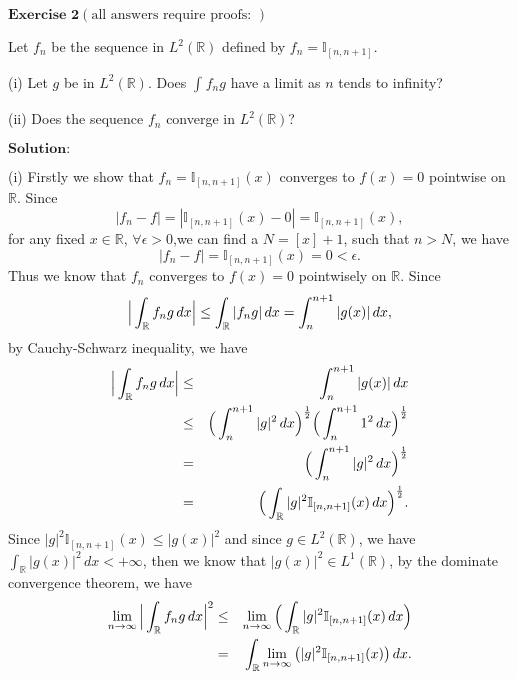 \documentclass[12pt,a4paper]{ctexart}
\begin{document}
\newpage


$\textbf{Exercise 2}  (\text{all answers require proofs: })$

Let $f_{n}$ be the sequence in $L^{2}(\mathbb{R})$ defined by $f_{n} = \mathbb{I}_{[n, n+1]}$.

(i) Let $g$ be in $L^{2}(\mathbb{R})$. Does $\int_{}^{} f_{n} g$ have a limit as $n$ tends to infinity?

(ii) Does the sequence $f_{n}$ converge in $L^{2}(\mathbb{R})$?

\vspace{8pt}
$\textbf{Solution:}$

(i) Firstly we show that $f_{n} = \mathbb{I}_{[n, n+1]} (x)$ converges to $f(x) = 0$ pointwise on $\mathbb{R}$. Since 
\begin{equation*}
    |f_{n} - f| = |\mathbb{I}_{[n, n+1]} (x) - 0| = \mathbb{I}_{[n, n+1]} (x), 
\end{equation*}
for any fixed $x \in \mathbb{R}$, $\forall \epsilon > 0$,we can find a $N = [x] + 1$, such that $n > N$, we have 
\begin{equation*}
    |f_{n} - f| = \mathbb{I}_{[n, n+1]} (x) = 0 < \epsilon.
\end{equation*}
Thus we know that $f_{n}$ converges to $f(x) = 0$ pointwisely on $\mathbb{R}$. Since  
\begin{equation*}
    \Big{|} \int_{\mathbb{R}}^{} f_{n} g \, d x \Big{|} \leq \int_{\mathbb{R}}^{} | f_{n} g | \, d x = \int_{n}^{n + 1} | g (x) | \, d x,
\end{equation*}
by Cauchy-Schwarz inequality, we have
\begin{eqnarray*}
\Big{|} \int_{\mathbb{R}}^{} f_{n} g \, d x \Big{|} & \leq & \int_{n}^{n + 1} | g (x) | \, d x \\
& \leq & \Big{(} \int_{n}^{n+1} |g|^{2} \, d x \Big{)}^{\frac{1}{2}} \Big{(} \int_{n}^{n+1} 1^{2} \, d x \Big{)}^{\frac{1}{2}} \\
& = & \Big{(} \int_{n}^{n+1} |g|^{2} \, d x \Big{)}^{\frac{1}{2}} \\ 
& = & \Big{(} \int_{\mathbb{R}}^{} |g|^{2} \mathbb{I}_{[n, n+1]} (x) \, d x \Big{)}^{\frac{1}{2}}.
\end{eqnarray*}
Since $|g|^{2} \mathbb{I}_{[n, n+1]} (x) \leq |g(x)|^{2}$ and since $g \in L^{2}(\mathbb{R})$, we have $\int_{\mathbb{R}}^{} |g(x)|^{2} \, d x < + \infty$, then we know that $|g(x)|^{2} \in L^{1}(\mathbb{R})$, by the dominate convergence theorem, we have
\begin{eqnarray*}
\lim_{n \to \infty} \Big{|} \int_{\mathbb{R}}^{} f_{n} g \, d x \Big{|}^{2} & \leq & \lim_{n \to \infty} \Big{(} \int_{\mathbb{R}}^{} |g|^{2} \mathbb{I}_{[n, n+1]} (x) \, d x \Big{)} \\
& = & \int_{\mathbb{R}}^{} \lim_{n \to \infty} \big{(} |g|^{2} \mathbb{I}_{[n, n+1]} (x)  \big{)} \, d x.
\end{eqnarray*}
\end{document}
